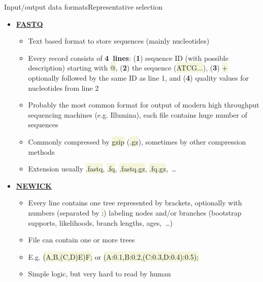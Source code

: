 \documentclass[compress, xelatex, 11pt, xcolor=svgnames, aspectratio=169,
	hyperref={
		bookmarks=true,
		unicode=true,
		colorlinks=true,
		pdftitle={Molecular data in R},
		plainpages=false,
		pdfauthor={Vojtech Zeisek},
		pdfsubject={Course about phylogeny and evolution in R},
		pdfcreator={XeLaTeX},
		pdfkeywords={R, evolution, phylogeny, molecular data},
		linkcolor=Crimson, %
		anchorcolor=Magenta, %
		citecolor=Magenta, %
		filecolor=Magenta, %
		menucolor=Magenta, %
		urlcolor=DodgerBlue, %
		},
	url={hyphens, lowtilde} %
	]{beamer}
\renewcommand{\texttt}[1]{\colorbox{Beige}{{\ttfamily #1}}}
\begin{document}
\begin{frame}[allowframebreaks]{Input/output data formats}{Representative selection}
\begin{itemize}
\begin{itemize}
			\item Each sequence can be on single line, or on multiple lines
			\item Can store also alignments (practically sequences of same length, with marked gaps and missing data)
			\item Larger sequences are sometimes compressed (mostly by gzip --- \texttt{*.gz})
			\item Extension usually \texttt{*.fasta} (generic, also \texttt{*.fas}, \texttt{*.fa}, \texttt{*.seq}, \texttt{*.fsa}), \texttt{*.fna} (nucleic acid), \texttt{*.ffn} (nucleotides, coding regions), \texttt{*.faa} (amino acids), \texttt{*.frn} (non-coding RNA),~\ldots
		\end{itemize}
		\item \href{https://en.wikipedia.org/wiki/FASTQ_format}{\textbf{FASTQ}}
		\begin{itemize}
			\item Text based format to store sequences (mainly nucleotides)
			\item Every record consists of \textbf{4~lines}: (\textbf{1}) sequence ID (with possible description) starting with \texttt{@}, (\textbf{2}) the sequence (\texttt{ATCG...}), (\textbf{3}) \texttt{+} optionally followed by the same ID as line 1, and (\textbf{4}) quality values for nucleotides from line 2
			\item Probably the most common format for output of modern high throughput sequencing machines (e.g. Illumina), each file contains huge number of sequences
			\item Commonly compressed by \texttt{gzip} (\texttt{*.gz}), sometimes by other compression methods
			\item Extension usually \texttt{*.fastq}, \texttt{*.fq}, \texttt{*.fastq.gz}, \texttt{*.fq.gz},~\ldots
		\end{itemize}
		\item \href{https://en.wikipedia.org/wiki/Newick_format}{\textbf{NEWICK}}
		\begin{itemize}
			\item Every line contains one tree represented by brackets, optionally with numbers (separated by \texttt{:}) labeling nodes and/or branches (bootstrap supports, likelihoods, branch lengths, ages,~\ldots)
			\item File can contain one or more trees
			\item E.g. \texttt{(A,B,(C,D)E)F;} or \texttt{(A:0.1,B:0.2,(C:0.3,D:0.4):0.5);}
			\item Simple logic, but very hard to read by human

\end{itemize}
\end{itemize}
\end{frame}
\end{document}
